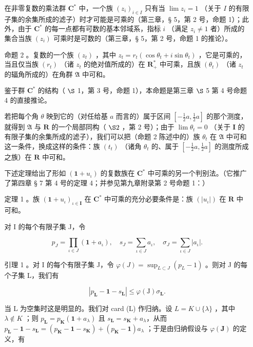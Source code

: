 在非零复数的乘法群 \(\mathbf{C}^*\) 中，一个族 \((z_{i})_{i\in I}\) 只有当 \(\lim z_{i} = 1\) （关于 \(I\) 的有限子集的余集所成的滤子）时才可能是可乘的（第三章，§ 5，第 2 号，命题 1）；此外，由于 \(\mathbf{C}^*\) 的每一点都有可数的基本邻域系，指标 \(i\) （满足 \(z_{i}\neq 1\) 者）所成的集合当族 \((z_{i})\) 可乘时是可数的（第三章，§ 5，第 2 号，命题 1 的推论）。

命题 2 。复数的一个族 \((z_{t})\) ，其中 \(z_{t} = r_{t}(\cos \theta_{t} + i\sin \theta_{t})\) ，它是可乘的，当且仅当族 \((r_{t})\) （诸 \(z_{t}\) 的绝对值所成的）在 \(\mathbf{R}_{+}^{*}\) 中可乘，且族 \((\theta_{t})\) （诸 \(z_{t}\) 的辐角所成的）在角群 \(\mathfrak{A}\) 中可和。

鉴于群 \(\mathbf{C}^*\) 的结构（ \(\S\) 1，第 3 号，命题 1），本命题是第三章 \(\S\) 5 第 4 号命题 4 的直接推论。

若把每个角 \(\theta\) 映到它的（对任给基 \(a\) 而言的）属于区间 \([- \frac{1}{2} a, \frac{1}{2} a]\) 的那个测度，就得到 \(\mathfrak{A}\) 与 \(\mathbf{R}\) 的一个局部同构（ \(\S 2\) ，第 2 号）；由于 \(\lim \theta_{t} = 0\) （关于 \(\mathbf{I}\) 的有限子集的余集所成的滤子），我们可以把（命题 2 陈述中的）族 \(\theta_t\) 在 \(\mathfrak{A}\) 中可和这一条件，换成这样的条件：族 \((t_t)\) （诸角 \(\theta_t\) 的、属于 \([- \frac{1}{2} a, \frac{1}{2} a]\) 的测度所成之族）在 \(\mathbf{R}\) 中可和。

下述定理给出了形如 \((\mathbf{1} + u_{\iota})\) 的复数族在 \(\mathbf{C}^*\) 中可乘的另一个判别法。（它推广了第四章 § 7 第 4 号的定理 4；并参见第九章附录第 2 号命题 1：）

定理 1 。族 \((\mathbf{1} + u_{\iota})_{\iota \in \mathbf{I}}\) 在 \(\mathbf{C}^*\) 中可乘的充分必要条件是：族 \((|u_{\iota}|)\) 在 \(\mathbf{R}\) 中可和。

对 I 的每个有限子集 J，令

\[
p _ {J} = \prod_ {\iota \in J} (\mathbf{1} + a _ {\iota}), \quad s _ {J} = \sum_ {\iota \in J} a _ {\iota}, \quad \sigma_ {J} = \sum_ {\iota \in J} | a _ {\iota} |.
\]

引理 1 。对 I 的每个有限子集 J，令 \(\varphi(J) = \sup_{L \subset J} (p_L - 1)\) 。则对 J 的每个子集 L，我们有

\[
\left| p _ {\mathbf {L}} - \mathbf {1} - s _ {\mathbf {L}} \right| \leqslant \varphi (\mathrm{J}) \sigma_ {\mathbf {L}}.\tag{2}
\]

当 L 为空集时这是明显的。我们对 card (L) 作归纳。设 \(L = K \cup \{\lambda\}\) ，其中 \(\lambda \notin K\) ；则 \(p_{\mathbf{L}} = p_{\mathbf{K}}(\mathbf{1} + a_{\lambda})\) 且 \(s_{\mathbf{L}} = s_{\mathbf{K}} + a_{\lambda}\)，从而 \(p_{\mathbf{L}} - \mathbf{1} - s_{\mathbf{L}} = (p_{\mathbf{K}} - \mathbf{1} - s_{\mathbf{K}}) + (p_{\mathbf{K}} - \mathbf{1})a_{\lambda}\) ；于是由归纳假设与 \(\varphi(\mathbf{J})\) 的定义，有

